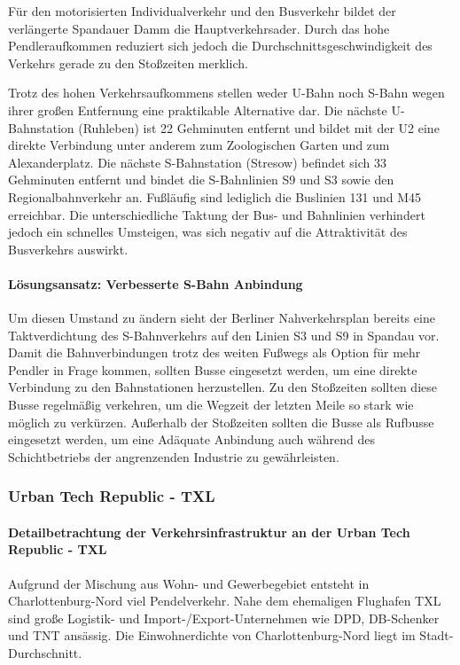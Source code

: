 
Für den motorisierten Individualverkehr und den Busverkehr bildet der verlängerte Spandauer Damm die Hauptverkehrsader. Durch das hohe Pendleraufkommen reduziert sich jedoch die Durchschnittsgeschwindigkeit des Verkehrs gerade zu den Stoßzeiten merklich.

Trotz des hohen Verkehrsaufkommens stellen weder U-Bahn noch S-Bahn wegen ihrer großen Entfernung eine praktikable Alternative dar. Die nächste U-Bahnstation (Ruhleben) ist 22 Gehminuten entfernt und bildet mit der U2 eine direkte Verbindung unter anderem zum Zoologischen Garten und zum Alexanderplatz. Die nächste S-Bahnstation (Stresow) befindet sich 33 Gehminuten entfernt und bindet die S-Bahnlinien S9 und S3 sowie den Regionalbahnverkehr an. Fußläufig sind lediglich die Buslinien 131 und M45 erreichbar. Die unterschiedliche Taktung der Bus- und Bahnlinien verhindert jedoch ein schnelles Umsteigen, was sich negativ auf die Attraktivität des Busverkehrs auswirkt.

\paragraph{Lösungsansatz: Verbesserte S-Bahn Anbindung}
Um diesen Umstand zu ändern sieht der Berliner Nahverkehrsplan bereits eine Taktverdichtung des S-Bahnverkehrs auf den Linien S3 und S9 in Spandau vor. Damit die Bahnverbindungen trotz des weiten Fußwegs als Option für mehr Pendler in Frage kommen, sollten Busse eingesetzt werden, um eine direkte Verbindung zu den Bahnstationen herzustellen. Zu den Stoßzeiten sollten diese Busse regelmäßig verkehren, um die Wegzeit der letzten Meile so stark wie möglich zu verkürzen. Außerhalb der Stoßzeiten sollten die Busse als Rufbusse eingesetzt werden, um eine Adäquate Anbindung auch während des Schichtbetriebs der angrenzenden Industrie zu gewährleisten.

\subsubsection{Urban Tech Republic - TXL}
\paragraph{Detailbetrachtung der Verkehrsinfrastruktur an der Urban Tech Republic - TXL}
Aufgrund der Mischung aus Wohn- und Gewerbegebiet entsteht in Charlottenburg-Nord viel Pendelverkehr. Nahe dem ehemaligen Flughafen TXL sind große Logistik- und Import-/Export-Unternehmen wie DPD, DB-Schenker und TNT ansässig. Die Einwohnerdichte von Charlottenburg-Nord liegt im Stadt-Durchschnitt.

